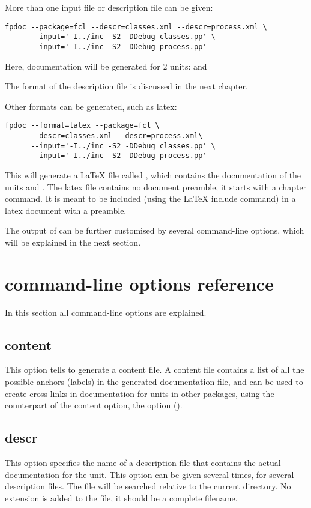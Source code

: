 More than one input file or description file can be given:
\begin{verbatim}
fpdoc --package=fcl --descr=classes.xml --descr=process.xml \
      --input='-I../inc -S2 -DDebug classes.pp' \
      --input='-I../inc -S2 -DDebug process.pp'
\end{verbatim}
Here, documentation will be generated for 2 units: 
and 

The format of the description file is discussed in the next chapter.

Other formats can be generated, such as latex:
\begin{verbatim}
fpdoc --format=latex --package=fcl \
      --descr=classes.xml --descr=process.xml\
      --input='-I../inc -S2 -DDebug classes.pp' \
      --input='-I../inc -S2 -DDebug process.pp'
\end{verbatim}
This will generate a LaTeX file called , which contains the
documentation of the units \file{classes} and . The latex file
contains no document preamble, it starts with a chapter command. 
It is meant to be included (using the LaTeX include command) in a latex 
document with a preamble.

The output of \fpdoc can be further customised by several command-line
options, which will be explained in the next section.

\section{\fpdoc command-line options reference}
In this section all \fpdoc command-line options are explained.

\subsection{content}
\label{suse:content}
This option tells  \fpdoc to generate a content file. 
A content file contains a list of all the
possible anchors (labels) in the generated documentation file, and can be
used to create cross-links in documentation for units in other packages, 
using the counterpart of the content option, the  option
(\seesu{import}).

\subsection{descr}
\label{suse:descr}
This option specifies the name of a description file that contains the 
actual documentation for the unit. This option can be given several 
times, for several description files. The file will be searched relative to
the current directory. No extension is added to the file, it should be a
complete filename.

